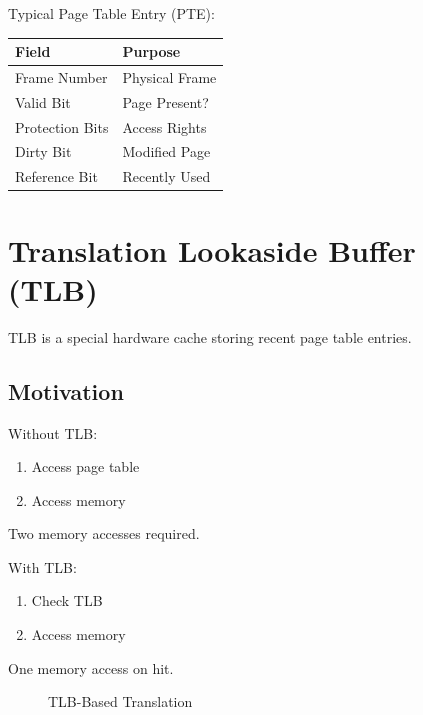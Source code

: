 Typical Page Table Entry (PTE):

\begin{center}
\begin{tabular}{ll}
\toprule
Field & Purpose \\
\midrule
Frame Number & Physical Frame \\
Valid Bit & Page Present? \\
Protection Bits & Access Rights \\
Dirty Bit & Modified Page \\
Reference Bit & Recently Used \\
\bottomrule
\end{tabular}
\end{center}

\section{Translation Lookaside Buffer (TLB)}

TLB is a special hardware cache storing recent page table entries.

\subsection{Motivation}

Without TLB:

\begin{enumerate}
\item Access page table
\item Access memory
\end{enumerate}

Two memory accesses required.

With TLB:

\begin{enumerate}
\item Check TLB
\item Access memory
\end{enumerate}

One memory access on hit.

\begin{figure}[H]
\centering
{}
\caption{TLB-Based Translation}
\end{figure}

